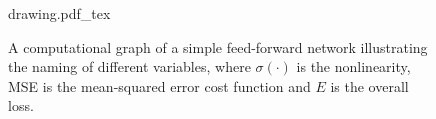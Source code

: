 \begin{figure}[bh!]
\centering
\newcommand{\repSigmoid}{$\sigma(\cdot)$}
\newcommand{\repLinear}{$\sum$}
\newcommand{\repMse}{MSE}
\newcommand{\repFirstSum}{$\Input j 1$}
\newcommand{\repLastSum}{$\Input i 0$}
\newcommand{\repFirstOutput}{\hspace{1.5cm}$\Con j i 0 \!=\! \Weight j i 0 \Out j 1$}
\newcommand{\repLastOutput}{$\Out i 0$}
\newcommand{\repLoss}{$E$}
\def\svgwidth{0.9\textwidth}
\hspace{-2cm}
{drawing.pdf_tex}
\hspace{-2cm}
\caption{A computational graph of a simple feed-forward network illustrating the naming of different variables, where $\sigma(\cdot)$ is the nonlinearity, MSE is the mean-squared error cost function and $E$ is the overall loss.}
\label{fig:comp_graph}
\end{figure}